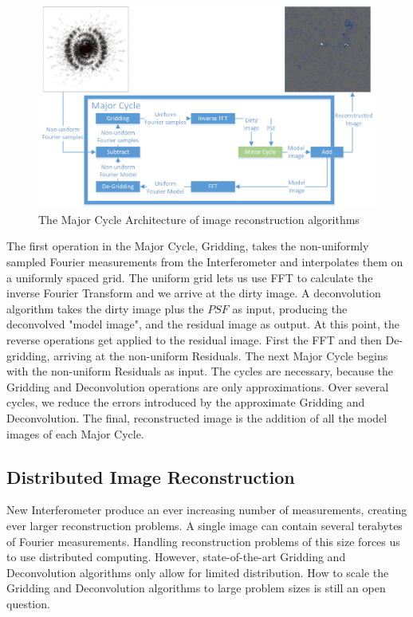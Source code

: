 \begin{figure}[h]
	\centering
	\includegraphics[width=0.80\linewidth]{./chapters/02.state/Major-Minor3.png}
	\caption{The Major Cycle Architecture of image reconstruction algorithms}
	\label{hypo:major3}
\end{figure}

The first operation in the Major Cycle, Gridding, takes the non-uniformly sampled Fourier measurements from the Interferometer and interpolates them on a uniformly spaced grid. The uniform grid lets us use FFT to calculate the inverse Fourier Transform and we arrive at the dirty image. A deconvolution algorithm takes the dirty image plus the $PSF$ as input, producing the deconvolved "model image", and the residual image as output. At this point, the reverse operations get applied to the residual image. First the FFT and then De-gridding, arriving at the non-uniform Residuals. The next Major Cycle begins with the non-uniform Residuals as input. The cycles are necessary, because the Gridding and Deconvolution operations are only approximations. Over several cycles, we reduce the errors introduced by the approximate Gridding and Deconvolution. The final, reconstructed image is the addition of all the model images of each Major Cycle. 

\subsection{Distributed Image Reconstruction}
New Interferometer produce an ever increasing number of measurements, creating ever larger reconstruction problems. A single image can contain several terabytes of Fourier measurements. Handling reconstruction problems of this size forces us to use distributed computing. However, state-of-the-art Gridding and Deconvolution algorithms only allow for limited distribution. How to scale the Gridding and Deconvolution algorithms to large problem sizes is still an open question.

